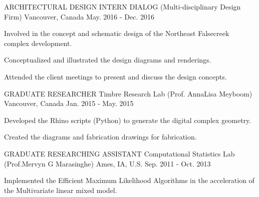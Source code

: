 

\begin{cventries}

  \cventry
    {ARCHITECTURAL DESIGN INTERN} %
    {DIALOG (Multi-disciplinary Design Firm)} %
    {Vancouver, Canada} %
    {May. 2016 - Dec. 2016} %
    {
      \begin{cvitems} %
        \item {Involved in the concept and schematic design of the Northeast Falsecreek complex development.}
        \item {Conceptualized and illustrated the design diagrams and renderings.}
        \item {Attended the client meetings to present and discuss the design concepts.}
      \end{cvitems}
    }

  \cventry
    {GRADUATE RESEARCHER} %
    {Timbre Research Lab (Prof. AnnaLisa Meyboom)} %
    {Vancouver, Canada} %
    {Jan. 2015 - May. 2015} %
    {
      \begin{cvitems} %
        \item {Developed the Rhino scripts (Python) to generate the digital complex geometry.}
        \item {Created the diagrams and fabrication drawings for fabrication.}
      \end{cvitems}
    }

  \cventry
    {GRADUATE RESEARCHING ASSISTANT} %
    {Computational Statistics Lab (Prof.Mervyn G Marasinghe)} %
    {Ames, IA, U.S.} %
    {Sep. 2011 - Oct. 2013} %
    {
      \begin{cvitems} %
        \item {Implemented the Efficient Maximum Likelihood Algorithms in the acceleration of the Multivariate linear mixed model.}
      \end{cvitems}
    }


\end{cventries}
